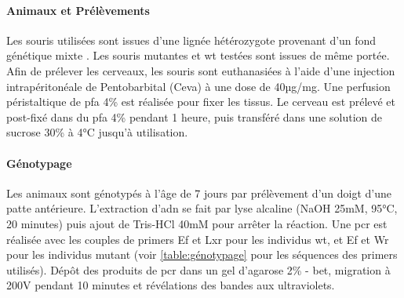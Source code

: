 \paragraph{Animaux et Prélèvements}
\label{par:AnimEtPrelev}
	Les souris utilisées sont issues d'une lignée hétérozygote provenant d'un fond génétique mixte \cite{Messeant2015, Messeant2017}. Les souris mutantes \mcrd et \gls{wt} testées sont issues de même portée. Afin de prélever les cerveaux, les souris sont  euthanasiées à l'aide d'une injection intrapéritonéale de Pentobarbital (Ceva\textregistered) à une dose de 40µg/mg. Une perfusion péristaltique de \gls{pfa} 4\% est réalisée pour fixer les tissus. Le cerveau est prélevé et post-fixé dans du \gls{pfa} 4\% pendant 1 heure, puis transféré dans une solution de sucrose 30\% à 4°C jusqu'à utilisation. 
	
\paragraph{Génotypage}
\label{par:genotypage}
	Les animaux sont génotypés à l'âge de 7 jours par prélèvement d'un doigt d'une patte antérieure. L'extraction d'\acrshort{adn} se fait par lyse alcaline (NaOH 25mM, 95°C, 20 minutes) puis ajout de Tris-HCl 40mM pour arrêter la réaction. Une \acrshort{pcr} est réalisée avec les couples de primers Ef et Lxr  pour les individus \gls{wt}, et Ef et Wr pour les individus mutant (voir \cref{table:génotypage} pour les séquences des primers utilisés). Dépôt des produits de \acrshort{pcr} dans un gel d'agarose 2\% - \acrshort{bet}, migration à 200V pendant 10 minutes et révélations des bandes aux ultraviolets.
	
	\begin{table}[h]
	\end{table}
\FloatBarrier
	
